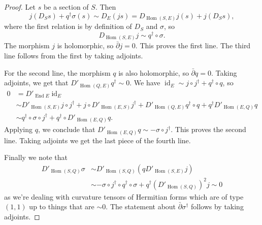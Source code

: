 \documentclass[10pt,a4paper]{amsart}
\theoremstyle{definition}
\DeclareMathOperator{\End}{End}
\DeclareMathOperator{\Hom}{Hom}
\DeclareMathOperator{\id}{id}
\def\snd{\sigma}
\begin{document}
\begin{proof}
Let $s$ be a section of $S$. Then
\[
j(D_S s) + q^\dagger \snd(s)
\sim D_E(js)
= D_{\Hom(S,E)}j (s) + j(D_S s),
\]
where the first relation is by definition of $D_S$ and $\snd$, so
\[
D_{\Hom(S,E)}j \sim q^\dagger \circ \snd.
\]
The morphism $j$ is holomorphic, so $\bar\partial j = 0$. This proves the first line. The third line follows from the first by taking adjoints.


For the second line, the morphism $q$ is also holomorphic, so $\bar\partial q = 0$. Taking adjoints, we get that $D'_{\Hom(Q,E)} q^\dagger \sim 0$.
We have $\id_E \sim j \circ j^\dagger + q^\dagger \circ q$, so
\begin{align*}
0
&= D'_{\End E} \id_E
\\
&\sim D'_{\Hom(S,E)} j \circ j^\dagger + j \circ D'_{\Hom(E,S)}j^\dagger
+ D'_{\Hom(Q,E)}q^\dagger \circ q + q^\dagger D'_{\Hom(E,Q)} q
\\
&\sim q^\dagger \circ \snd \circ j^\dagger + q^\dagger \circ D'_{\Hom(E,Q)}q.
\end{align*}
Applying $q$, we conclude that $D'_{\Hom(E,Q)}q \sim - \snd \circ j^\dagger$. This proves the second line. Taking adjoints we get the last piece of the fourth line.

Finally we note that
\begin{align*}
D'_{\Hom(S,Q)} \snd
&\sim D'_{\Hom(S,Q)} (q D'_{\Hom(S,E)}j)
\\
&\sim - \snd \circ j^\dagger \circ q^\dagger \circ \snd
+ q^\dagger (D'_{\Hom(S,Q)})^2 j
\sim 0
\end{align*}
as we're dealing with curvature tensors of Hermitian forms which are of type $(1,1)$ up to things that are $\sim 0$. The statement about $\bar\partial \snd^\dagger$ follows by taking adjoints.
\end{proof}
\end{document}
